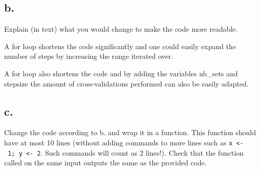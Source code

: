 \documentclass[
]{article}
\newenvironment{Shaded}{\begin{snugshade}}{\end{snugshade}}
\newcommand{\CommentTok}[1]{\textcolor[rgb]{0.56,0.35,0.01}{\textit{#1}}}
\newcommand{\ControlFlowTok}[1]{\textcolor[rgb]{0.13,0.29,0.53}{\textbf{#1}}}
\newcommand{\DecValTok}[1]{\textcolor[rgb]{0.00,0.00,0.81}{#1}}
\newcommand{\FloatTok}[1]{\textcolor[rgb]{0.00,0.00,0.81}{#1}}
\newcommand{\FunctionTok}[1]{\textcolor[rgb]{0.13,0.29,0.53}{\textbf{#1}}}
\newcommand{\NormalTok}[1]{#1}
\newcommand{\OtherTok}[1]{\textcolor[rgb]{0.56,0.35,0.01}{#1}}
\newcommand{\SpecialCharTok}[1]{\textcolor[rgb]{0.81,0.36,0.00}{\textbf{#1}}}
\newcommand{\StringTok}[1]{\textcolor[rgb]{0.31,0.60,0.02}{#1}}
\begin{document}
\subsection{b.}\label{b.-4}

Explain (in text) what you would change to make the code more readable.

A for loop shortens the code significantly and one could easily expand
the number of steps by increasing the range iterated over.

A for loop also shortens the code and by adding the variables nb\_sets
and stepsize the amount of cross-validations performed can also be
easily adapted.

\subsection{c.}\label{c.-4}

Change the code according to b. and wrap it in a function. This function
should have at most 10 lines (without adding commands to more lines such
as \texttt{x\ \textless{}-\ 1;\ y\ \textless{}-\ 2}. Such commands will
count as 2 lines!). Check that the function called on the same input
outputs the same as the provided code.

\begin{Shaded}
\end{Shaded}
\end{document}
